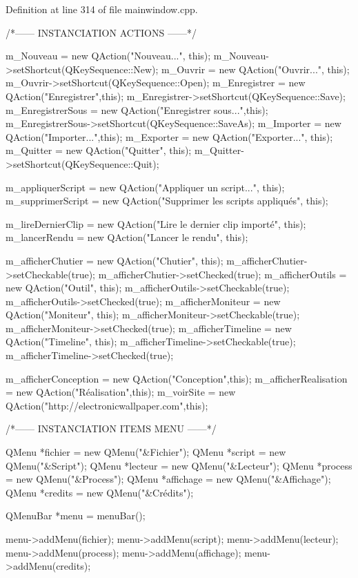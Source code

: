\-Definition at line 314 of file mainwindow.\-cpp.


\begin{DoxyCode}
{
    /*------  INSTANCIATION ACTIONS  ------*/

    m_Nouveau = new QAction("Nouveau...", this);
    m_Nouveau->setShortcut(QKeySequence::New);
    m_Ouvrir = new QAction("Ouvrir...", this);
    m_Ouvrir->setShortcut(QKeySequence::Open);
    m_Enregistrer = new QAction("Enregistrer",this);
    m_Enregistrer->setShortcut(QKeySequence::Save);
    m_EnregistrerSous = new QAction("Enregistrer sous...",this);
    m_EnregistrerSous->setShortcut(QKeySequence::SaveAs);
    m_Importer = new QAction("Importer...",this);
    m_Exporter = new QAction("Exporter...", this);
    m_Quitter = new QAction("Quitter", this);
    m_Quitter->setShortcut(QKeySequence::Quit);


    m_appliquerScript = new QAction("Appliquer un script...", this);
    m_supprimerScript = new QAction("Supprimer les scripts appliqués", this);

    m_lireDernierClip = new QAction("Lire le dernier clip importé", this);
    m_lancerRendu = new QAction("Lancer le rendu", this);

    m_afficherChutier = new QAction("Chutier", this);
    m_afficherChutier->setCheckable(true);
    m_afficherChutier->setChecked(true);
    m_afficherOutils = new QAction("Outil", this);
    m_afficherOutils->setCheckable(true);
    m_afficherOutils->setChecked(true);
    m_afficherMoniteur = new QAction("Moniteur", this);
    m_afficherMoniteur->setCheckable(true);
    m_afficherMoniteur->setChecked(true);
    m_afficherTimeline = new QAction("Timeline", this);
    m_afficherTimeline->setCheckable(true);
    m_afficherTimeline->setChecked(true);

    m_afficherConception = new QAction("Conception",this);
    m_afficherRealisation = new QAction("Réalisation",this);
    m_voirSite = new QAction("http://electronicwallpaper.com",this);

    /*------  INSTANCIATION ITEMS MENU  ------*/

    QMenu *fichier = new QMenu("&Fichier");
    QMenu *script = new QMenu("&Script");
    QMenu *lecteur = new QMenu("&Lecteur");
    QMenu *process = new QMenu("&Process");
    QMenu *affichage = new QMenu("&Affichage");
    QMenu *credits = new QMenu("&Crédits");

    QMenuBar *menu = menuBar();

    menu->addMenu(fichier);
    menu->addMenu(script);
    menu->addMenu(lecteur);
    menu->addMenu(process);
    menu->addMenu(affichage);
    menu->addMenu(credits);

}
\end{DoxyCode}
